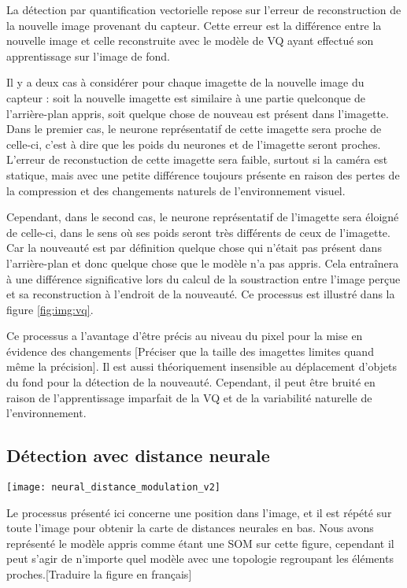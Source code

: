 	La détection par quantification vectorielle repose sur l'erreur de reconstruction de la nouvelle image provenant du capteur. Cette erreur est la différence entre la nouvelle image et celle reconstruite avec le modèle de VQ ayant effectué son apprentissage sur l'image de fond.

	Il y a deux cas à considérer pour chaque imagette de la nouvelle image du capteur : soit la nouvelle imagette est similaire à une partie quelconque de l'arrière-plan appris, soit quelque chose de nouveau est présent dans l'imagette. Dans le premier cas, le neurone représentatif de cette imagette sera proche de celle-ci, c'est à dire que les poids du neurones et de l'imagette seront proches. L'erreur de reconstuction de cette imagette sera faible, surtout si la caméra est statique, mais avec une petite différence toujours présente en raison des pertes de la compression et des changements naturels de l'environnement visuel.
	
	Cependant, dans le second cas, le neurone représentatif de l'imagette sera éloigné de celle-ci, dans le sens où ses poids seront très différents de ceux de l'imagette. Car la nouveauté est par définition quelque chose qui n'était pas présent dans l'arrière-plan et donc quelque chose que le modèle n'a pas appris. Cela entraînera à une différence significative lors du calcul de la soustraction entre l'image perçue et sa reconstruction à l'endroit de la nouveauté. Ce processus est illustré dans la figure \ref{fig:img:vq}. 

	Ce processus a l'avantage d'être précis au niveau du pixel pour la mise en évidence des changements [Préciser que la taille des imagettes limites quand même la précision]. Il est aussi théoriquement insensible au déplacement d'objets du fond pour la détection de la nouveauté. Cependant, il peut être bruité en raison de l'apprentissage imparfait de la VQ et de la variabilité naturelle de l'environnement.

	\subsection{Détection avec distance neurale}

	\begin{figureth}
		\texttt{[image: neural\_distance\_modulation\_v2]}
		\caption[Détection de nouveauté avec topologie]{Le processus présenté ici concerne une position dans l'image, et il est répété sur toute l'image pour obtenir la carte de distances neurales en bas. Nous avons représenté le modèle appris comme étant une SOM sur cette figure, cependant il peut s'agir de n'importe quel modèle avec une topologie regroupant les éléments proches.[Traduire la figure en français]}\label{fig:img:topo}
	\end{figureth}

